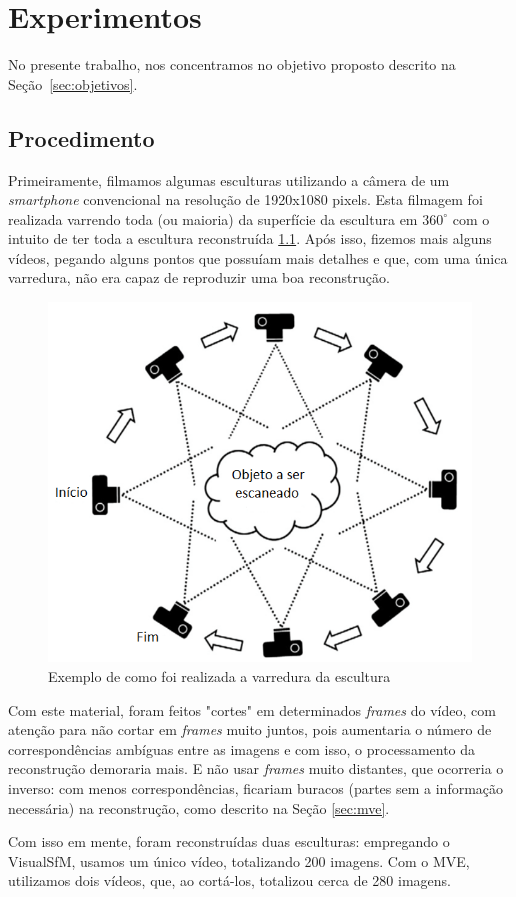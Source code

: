 \chapter{Experimentos}\label{sec:experiments}
No presente trabalho, nos concentramos no objetivo proposto descrito na Seção~\ref{sec:objetivos}.

\section{Procedimento}
Primeiramente, filmamos algumas esculturas utilizando a câmera de um \emph{smartphone} convencional na resolução de 1920x1080 pixels. Esta filmagem foi realizada varrendo toda (ou maioria) da superfície da escultura em $360^{\circ}$ com o intuito de ter toda a escultura reconstruída \ref{fig:procedimentoscan}.
Após isso, fizemos mais alguns vídeos, pegando alguns pontos que possuíam mais detalhes e que, com uma única varredura, não era capaz de reproduzir uma boa reconstrução.

\begin{figure}[!h]
	\centering
	\includegraphics[width=0.4\linewidth]{figs/procedimentoscan.png}
	\caption{%
	Exemplo de como foi realizada a varredura da escultura
	}\label{fig:procedimentoscan}
\end{figure}

Com este material, foram feitos "cortes" em determinados \emph{frames} do vídeo, com atenção para não cortar em \emph{frames} muito juntos, pois aumentaria o número de correspondências ambíguas entre as imagens e com isso, o processamento da reconstrução demoraria mais. E não usar \emph{frames} muito distantes, que ocorreria o inverso: com menos correspondências, ficariam buracos (partes sem a informação necessária) na reconstrução, como descrito na Seção \ref{sec:mve}.

Com isso em mente, foram reconstruídas duas esculturas: empregando o VisualSfM, usamos um único vídeo, totalizando 200 imagens. %
Com o MVE, utilizamos dois vídeos, que, ao cortá-los, totalizou cerca de 280 imagens. %

